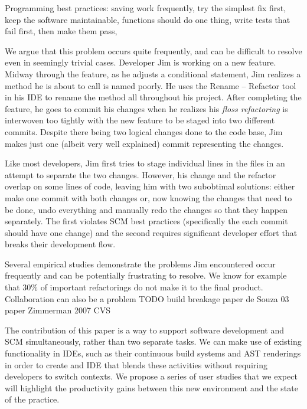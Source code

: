 \documentclass[conference]{IEEEtran}
\newcommand{\purpose}[1]{\textsc{\textbf{#1}}}
\begin{document}
Programming best practices: saving work frequently, try the simplest fix first, keep the software maintainable, functions should do one thing, write tests that fail first, then make them pass, 

We argue that this problem occurs quite frequently, and can be difficult to resolve even in seemingly trivial cases. 
Developer Jim is working on a new feature.
Midway through the feature, as he adjusts a conditional statement,
Jim realizes a method he is about to call is named poorly.  
He uses the Rename -- Refactor tool in his IDE to rename the method all
throughout his project. 
After completing the feature, he goes to commit his changes when he realizes
his \textit{floss refactoring} is interwoven too tightly with the new feature
to be staged into two different commits.  
Despite there being two logical changes done to the code base, Jim makes just one
(albeit very well explained) commit representing the changes.

Like most developers, Jim first tries to stage individual lines in the files in an attempt to 
separate the two changes.
However, his change and the refactor overlap on some lines of code, leaving him with two subobtimal
solutions: either make one commit with both changes or, now knowing the changes that need to be done, undo everything and manually redo the changes so that they happen separately.
The first violates SCM best practices (specifically the each commit should have one change) and the second requires significant developer effort that breaks their development flow.

Several empirical studies demonstrate the problems Jim encountered occur frequently and can be potentially frustrating to resolve.
We know for example that 30\% of important refactorings do not make it to the final product.
Collaboration can also be a problem
TODO build breakage paper
de Souza 03 paper
Zimmerman 2007 CVS

The contribution of this paper is a way to support software development and SCM simultaneously, rather than two separate tasks.
We can make use of existing functionality in IDEs, such as their continuous build systems and AST renderings in order to create and IDE that blends these activities without requiring developers to switch contexts.
We propose a series of user studies that we expect will highlight the productivity gains between this new environment and the state of the practice.
\end{document}
